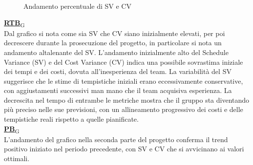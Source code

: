 \begin{figure*}[!h]
    \caption{Andamento percentuale di SV e CV}
\end{figure*}
\begin{flushleft}
\href{https://7last.github.io/docs/pb/documentazione-interna/glossario\#requirements-and-technology-baseline}{\textbf{RTB}\textsubscript{G}} \\
Dal grafico si nota come sia SV che CV siano inizialmente elevati, per poi decrescere durante la prosecuzione del progetto, in particolare si nota un andamento altalenante del SV. L'andamento inizialmente alto del Schedule Variance (SV) e del Cost Variance (CV) indica una possibile sovrastima iniziale dei tempi e dei costi, dovuta all'inesperienza del team. La variabilità del SV suggerisce che le stime di tempistiche iniziali erano eccessivamente conservative, con aggiustamenti successivi man mano che il team acquisiva esperienza. La decrescita nel tempo di entrambe le metriche mostra che il gruppo sta diventando più preciso nelle sue previsioni, con un allineamento progressivo dei costi e delle tempistiche reali rispetto a quelle pianificate. \\
\href{https://7last.github.io/docs/pb/documentazione-interna/glossario\#product-baseline}{\textbf{PB}\textsubscript{G}} \\
L'andamento del grafico nella seconda parte del progetto conferma il trend positivo iniziato nel periodo precedente, con SV e CV che si avvicinano ai valori ottimali.
\end{flushleft}

